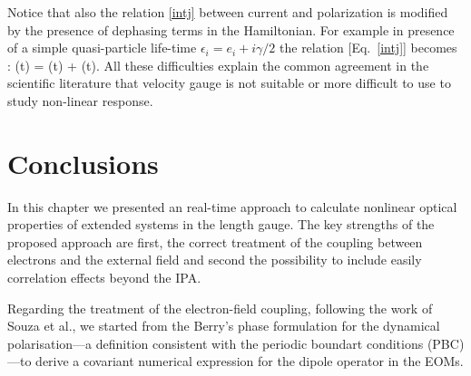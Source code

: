 Notice that also the relation \eqref{intj} between current and polarization is modified by the presence of dephasing terms in the Hamiltonian. For example in presence of a simple quasi-particle life-time $\epsilon_i = e_i + i \gamma/2$ the relation [Eq.~\ref{intj}] becomes \cite{tokman}:
\be
 \JJ (t) = \dot \PP (t) + \gamma \PP (t).
\ee
All these difficulties explain the common agreement in the scientific literature that velocity gauge is not suitable or more difficult to use to study non-linear response\cite{boyd_gauge,PhysRevB.52.14636}.

\section{Conclusions}\label{conclusion}                                        
In this chapter we presented an \ai real-time approach to calculate nonlinear optical properties of extended systems in the length gauge. The key strengths of the proposed approach are first, the correct treatment of the coupling between electrons and the external field and second the possibility to include easily correlation effects beyond the IPA.

Regarding the treatment of the electron-field coupling, following the work of Souza et al.\cite{souza_prb}, we started from the Berry's phase formulation for the dynamical polarisation---a definition consistent with the periodic boundart conditions (PBC)---to derive a covariant numerical expression for the dipole operator in the EOMs.

